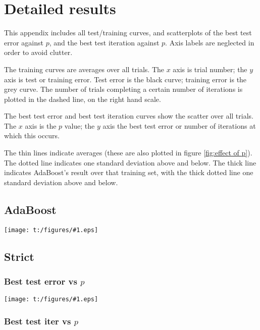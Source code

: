 

\newcommand{\ig}[1]{\hspace*{-1cm}\texttt{[image: t:/figures/\#1.eps]}}

\chapter{Detailed results}
\label{appendix:allgraphs}

This appendix includes all test/training curves, and scatterplots of
the best test error against $p$, and the best test iteration against
$p$.  Axis labels are neglected in order to avoid clutter.

The training curves are averages over all trials.  The $x$ axis is
trial number; the $y$ axis is test or training error.  Test error is
the black curve; training error is the grey curve.  The number of
trials completing a certain number of iterations is plotted in the
dashed line, on the right hand scale.

The best test error and best test iteration curves show the scatter
over all trials.  The $x$ axis is the $p$ value; the $y$ axis the best
test error or number of iterations at which this occurs.

The thin lines indicate averages (these are also plotted in figure
\ref{fig:effect of p}).  The dotted line indicates one standard
deviation above and below.  The thick line indicates AdaBoost's result
over that training set, with the thick dotted line one standard
deviation above and below.

\section{AdaBoost}

\ig{boost-summary}

\section{Strict}

\subsection*{Best test error vs $p$}

\ig{strict-err-summary}

\subsection*{Best test iter vs $p$}

